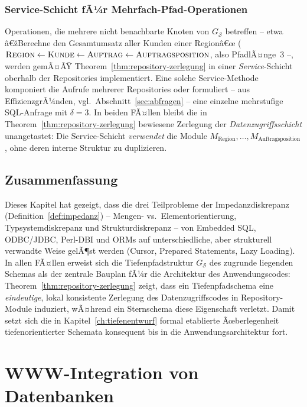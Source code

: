 ﻿\documentclass[a4paper,12pt]{report}
\theoremstyle{definition}
\theoremstyle{remark}
\begin{document}
\subsection{Service-Schicht fÃ¼r Mehrfach-Pfad-Operationen}

Operationen, die mehrere nicht benachbarte Knoten von
$G_{\mathcal{S}}$ betreffen -- etwa â€žBerechne den Gesamtumsatz aller
Kunden einer Regionâ€œ ($\textsc{Region}\leftarrow\textsc{Kunde}
\leftarrow\textsc{Auftrag}\leftarrow\textsc{Auftragsposition}$, also
PfadlÃ¤nge~3 --, werden gemÃ¤ÃŸ Theorem~\ref{thm:repository-zerlegung}
in einer \emph{Service}-Schicht oberhalb der Repositories
implementiert. Eine solche Service-Methode komponiert die Aufrufe
mehrerer Repositories oder formuliert -- aus EffizienzgrÃ¼nden, vgl.\
Abschnitt~\ref{sec:abfragen} -- eine einzelne mehrstufige
SQL-Anfrage mit $\delta=3$. In beiden FÃ¤llen bleibt die in
Theorem~\ref{thm:repository-zerlegung} bewiesene Zerlegung der
\emph{Datenzugriffsschicht} unangetastet: Die Service-Schicht
\emph{verwendet} die Module $M_{\text{Region}},\ldots,
M_{\text{Auftragsposition}}$, ohne deren interne Struktur zu
duplizieren.

\section{Zusammenfassung}

Dieses Kapitel hat gezeigt, dass die drei Teilprobleme der
Impedanzdiskrepanz (Definition~\ref{def:impedanz}) -- Mengen- vs.\
Elementorientierung, Typsystemdiskrepanz und Strukturdiskrepanz -- von
Embedded SQL, ODBC/JDBC, Perl-DBI und ORMs auf unterschiedliche, aber
strukturell verwandte Weise gelÃ¶st werden (Cursor, Prepared
Statements, Lazy Loading). In allen FÃ¤llen erweist sich die
Tiefenpfadstruktur $G_{\mathcal{S}}$ des zugrunde liegenden Schemas als
der zentrale Bauplan fÃ¼r die Architektur des Anwendungscodes:
Theorem~\ref{thm:repository-zerlegung} zeigt, dass ein Tiefenpfadschema
eine \emph{eindeutige}, lokal konsistente Zerlegung des
Datenzugriffscodes in Repository-Module induziert, wÃ¤hrend ein
Sternschema diese Eigenschaft verletzt. Damit setzt sich die in
Kapitel~\ref{ch:tiefenentwurf} formal etablierte Ãœberlegenheit
tiefenorientierter Schemata konsequent bis in die
Anwendungsarchitektur fort.

\chapter{WWW-Integration von Datenbanken}
\label{ch:www}
\end{document}

